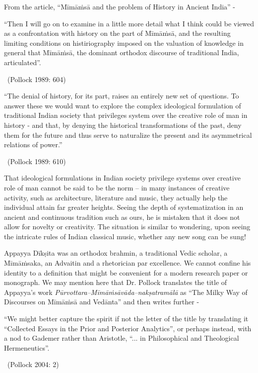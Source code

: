 From the article, “Mīmāṁsā and the problem of History in Ancient India” - 

\begin{myquote}
“Then I will go on to examine in a little more detail what I think could be viewed as a confrontation with history on the part of Mīmāṁsā, and the resulting limiting conditions on histiriography imposed on the valuation of knowledge in general that Mīmāṁsā, the dominant orthodox discourse of traditional India, articulated”. 

~\hfill (Pollock 1989: 604)
\end{myquote}


\begin{myquote}
“The denial of history, for its part, raises an entirely new set of questions. To answer these we would want to explore the complex ideological formulation of traditional Indian society that privileges system over the creative role of man in history - and that, by denying the historical transformations of the past, deny them for the future and thus serve to naturalize the present and its asymmetrical relations of power.” 

~\hfill (Pollock 1989: 610)
\end{myquote}

That ideological formulations in Indian society privilege systems over creative role of man cannot be said to be the norm – in many instances of creative activity, such as architecture, literature and music, they actually help the individual attain far greater heights. Seeing the depth of systematization in an ancient and continuous tradition such as ours, he is mistaken that it does not allow for novelty or creativity. The situation is similar to wondering, upon seeing the intricate rules of Indian classical music, whether any new song can be sung! 

Appayya Dīkṣita was an orthodox brahmin, a traditional Vedic scholar, a Mīmāṁsaka, an {Advaitin} and a rhetorician par excellence. We cannot confine his identity to a definition that might be convenient for a modern research paper or monograph. We may mention here that Dr. Pollock translates the title of Appayya’s work \textit{Pūrvottara--Mīmāṁsāvāda--nakṣatramālā} as “The Milky Way of Discourses on Mīmāṁsā and Vedānta” and then writes further -

\begin{myquote}
“We might better capture the spirit if not the letter of the title by translating it “Collected Essays in the Prior and Posterior Analytics”, or perhaps instead, with a nod to Gademer rather than Aristotle, “... in Philosophical and Theological Hermeneutics”. 

~\hfill (Pollock 2004: 2)
\end{myquote}

